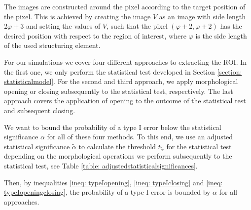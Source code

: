 \documentclass[a4paper,12pt]{article}
\theoremstyle{plain}
\theoremstyle{definition}
\numberwithin{equation}{section}
\begin{document}
The images are constructed around the pixel according to the target position of the pixel. This is achieved by creating the image $V$ as an image with side length $2 \varphi + 3$ and setting the values of $V$, such that the pixel $(\varphi + 2, \varphi + 2)$ has the desired position with respect to the region of interest, where $\varphi$ is the side length of the used structuring element.

For our simulations we cover four different approaches to extracting the ROI. In the first one, we only perform the statistical test developed in Section \ref{section: statisticalmodel}. For the second and third approach, we apply morphological opening or closing subsequently to the statistical test, respectively. The last approach covers the application of opening to the outcome of the statistical test and subsequent closing.

We want to bound the probability of a type I error below the statistical significance $\alpha$ for all of these four methods. To this end, we use an adjusted statistical significance $\tilde{\alpha}$ to calculate the threshold $t_{\tilde{\alpha}}$ for the statistical test depending on the morphological operations we perform subsequently to the statistical test, see Table \ref{table: adjustedstatisticalsignificances}.

\begin{table}[h]
	\centering
	\caption{Adjusted statistical significance for the statistical test depending on the morphological operations performed subsequently to the statistical test.}
	\label{table: adjustedstatisticalsignificances}
\end{table}

Then, by inequalities \eqref{ineq: typeIopening}, \eqref{ineq: typeIclosing} and \eqref{ineq: typeIopeningclosing}, the probability of a type I error is bounded by $\alpha$ for all approaches.
\end{document}
